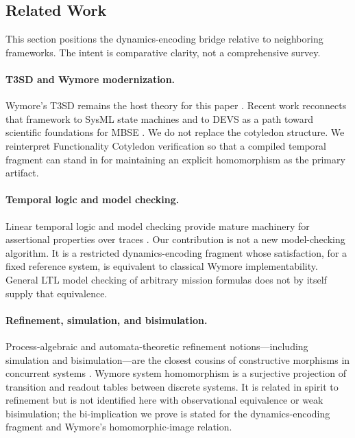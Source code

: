 \subsection{Related Work}
\label{sec:related-work}


This section positions the dynamics-encoding bridge relative to neighboring frameworks. The intent is comparative clarity, not a comprehensive survey.

\paragraph{T3SD and Wymore modernization.}
Wymore's T3SD remains the host theory for this paper \citep{Wymore1993}. Recent work reconnects that framework to SysML state machines and to DEVS as a path toward scientific foundations for MBSE \citep{salado2019wymore,wach2021devs,salado2019mbse}. We do not replace the cotyledon structure. We reinterpret Functionality Cotyledon verification so that a compiled temporal fragment can stand in for maintaining an explicit homomorphism as the primary artifact.

\paragraph{Temporal logic and model checking.}
Linear temporal logic and model checking provide mature machinery for assertional properties over traces \citep{Pnueli1977,BaierKatoen2008}. Our contribution is not a new model-checking algorithm. It is a restricted dynamics-encoding fragment whose satisfaction, for a fixed reference system, is equivalent to classical Wymore implementability. General LTL model checking of arbitrary mission formulas does not by itself supply that equivalence.

\paragraph{Refinement, simulation, and bisimulation.}
Process-algebraic and automata-theoretic refinement notions---including simulation and bisimulation---are the closest cousins of constructive morphisms in concurrent systems \citep{Milner1989,LynchTuttle1987}. Wymore system homomorphism is a surjective projection of transition and readout tables between discrete systems. It is related in spirit to refinement but is not identified here with observational equivalence or weak bisimulation; the bi-implication we prove is stated for the dynamics-encoding fragment and Wymore's homomorphic-image relation.

